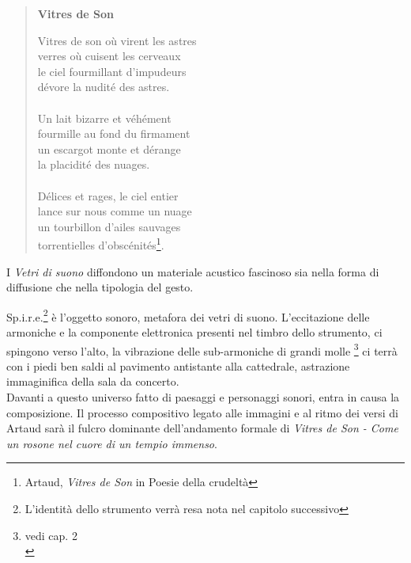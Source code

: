 \begin{quotation}
{\sf \textbf{Vitres de Son}

Vitres de son où virent les astres \\
verres où cuisent les cerveaux \\
le ciel fourmillant d'impudeurs \\
dévore la nudité des astres. \\ \\
Un lait bizarre et véhément \\
fourmille au fond du firmament \\
un escargot monte et dérange \\
la placidité des nuages. \\ \\
Délices et rages, le ciel entier \\
lance sur nous comme un nuage \\
un tourbillon d'ailes sauvages \\
torrentielles d'obscénités\footnote{Artaud, \textit{Vitres de Son} in Poesie della crudeltà}.}
\end{quotation}

I \textit{Vetri di suono} diffondono un materiale acustico fascinoso sia nella forma di diffusione che nella tipologia del gesto. 

Sp.i.r.e.\footnote{L'identità dello strumento verrà resa nota nel capitolo successivo} è l'oggetto sonoro, metafora dei vetri di suono. L'eccitazione delle armoniche e la componente elettronica presenti nel timbro dello strumento, ci spingono verso l'alto, la vibrazione delle sub-armoniche di grandi molle \footnote{vedi cap. 2 \\} ci terrà con i piedi ben saldi al pavimento antistante alla cattedrale, astrazione immaginifica della sala da concerto. \\
Davanti a questo universo fatto di paesaggi e personaggi sonori, entra in causa la composizione. Il processo compositivo legato alle immagini e al ritmo dei versi di Artaud sarà il fulcro dominante dell'andamento formale di \textit{Vitres de Son - Come un rosone nel cuore di un tempio immenso}.
